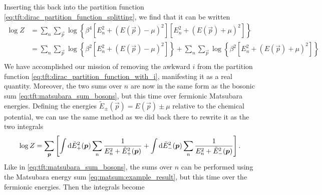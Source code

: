 Inserting this back into the partition function \eqref{eq:tft:dirac_partition_function_splitting}, we find that it can be written
\begin{equation}
\begin{split}
	\log Z & = \sum_n \sum_\vec{p} \log \left\{ \beta^4 \left[ E_n^2 + (E(\vec{p}) - \mu)^2 \right] \left[ E_n^2 + (E(\vec{p}) + \mu)^2 \right] \right\} \\
	       & = \sum_n \sum_\vec{p} \log \left\{ \beta^2 \left[ E_n^2 + (E(\vec{p}) - \mu)^2 \right] \right\} + \sum_n \sum_\vec{p} \log \left\{ \beta^2 \left[ E_n^2 + (E(\vec{p}) + \mu)^2 \right] \right\} \\
\end{split}
\label{eq:tft:fermion_log_sum}
\end{equation}
We have accomplished our mission of removing the awkward $i$ from the partition function \eqref{eq:tft:dirac_partition_function_with_i}, manifesting it as a real quantity.
Moreover, the two sums over $n$ are now in the same form as the bosonic sum \eqref{eq:tft:matsubara_sum_bosons}, but this time over fermionic Matsubara energies.
Defining the energies $\tilde E_\pm(\vec{p}) = E(\vec{p}) \pm \mu$ relative to the chemical potential, we can use the same method as we did back there to rewrite it as the two integrals
\begin{equation}
	\log Z = \sum_{\bm{p}} \left[ \int \mathop{}\!\mathrm{d} \tilde E_+^2({\bm{p}}) \sum_n \frac{1}{E_n^2 + \tilde E_+^2({\bm{p}})} +
	                             \int \mathop{}\!\mathrm{d} \tilde E_-^2({\bm{p}}) \sum_n \frac{1}{E_n^2 + \tilde E_-^2({\bm{p}})} \right] .
\label{eq:tft:matsubara_sum_fermions}
\end{equation}
Like in \eqref{eq:tft:matsubara_sum_bosons}, the sums over $n$ can be performed using the Matsubara energy sum \eqref{eq:matsum:example_result}, but this time over the fermionic energies.
Then the integrals become
